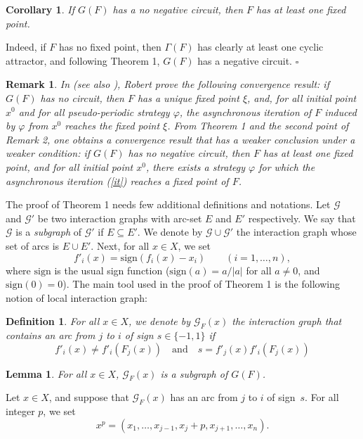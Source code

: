 \documentclass[11pt]{article}
\newtheorem{definition}{Definition}
\newtheorem{lemma}{Lemma}
\newtheorem{remark}{Remark}
\newtheorem{corollary}{Corollary}
\def\proof{\noindent{\bf Proof --~}}
\def\cqfd{\hfill$\square$}
\def\sgn{\mathrm{sign}}
\def\G{\mathscr{G}}
\def\GG{\mathcal{G}}
\def\1n{1,\dots,n}
\def\phi{\varphi}
\begin{document}
\begin{corollary}
If $G(F)$ has a no negative circuit, then $F$ has at least one fixed
point.
\end{corollary}


\proof 
Indeed, if $F$ has no fixed point, then $\Gamma(F)$ has clearly at
least one cyclic attractor, and following Theorem 1, $G(F)$ has a
negative circuit.
\cqfd


\begin{remark}
{\emph{In {\cite[Chapter 13]{R95}} (see also {\cite{BM00}}), Robert
prove the following convergence result: if $G(F)$ has no circuit, then
$F$ has a unique fixed point $\xi$, and, for all initial point $x^0$
and for all pseudo-periodic strategy $\phi$, the asynchronous
iteration of $F$ induced by $\phi$ from $x^0$ reaches the fixed point
$\xi$. From Theorem 1 and the second point of Remark 2, one obtains a
convergence result that has a weaker conclusion under a weaker
condition: if $G(F)$ has no negative circuit, then $F$ has at least
one fixed point, and for all initial point $x^0$, there exists a
strategy $\phi$ for which the asynchronous iteration (\ref{it})
reaches a fixed point of $F$.}}
\end{remark}


The proof of Theorem 1 needs few additional definitions and
notations. Let $\GG$ and $\GG'$ be two interaction graphs with arc-set
$E$ and $E'$ respectively. We say that $\GG$ is a {\emph{subgraph}} of
$\GG'$ if $E\subseteq E'$. We denote by $\GG\cup\GG'$ the interaction
graph whose set of arcs is $E\cup E'$. Next, for all $x\in X$, we set
\[
f'_i(x)=\sgn(f_i(x)-x_i)\qquad (i=\1n),
\]
where $\sgn$ is the usual sign function ($\sgn(a)=a/|a|$ for all
$a\neq 0$, and $\sgn(0)=0$). The main tool used in the proof of
Theorem 1 is the following notion of local interaction graph:

\begin{definition}
For all $x\in X$, we denote by $\G_F(x)$ the interaction graph that
contains an arc from $j$ to $i$ of sign $s\in\{-1,1\}$ if
\[
f'_i(x)\neq f'_i(F_j(x))\quad\textrm{and}\quad s=f'_j(x)f'_i(F_j(x))
\]
\end{definition}


\begin{lemma}{\label{lem:subgraph}}
For all $x\in X$, $\G_F(x)$ is a subgraph of $G(F)$.
\end{lemma}

\proof
Let $x\in X$, and suppose that $\G_F(x)$ has an arc from $j$ to $i$ of
sign~$s$. For all integer $p$, we set
\[
x^p=(x_1,\dots,x_{j-1},x_j+p,x_{j+1},\dots,x_n).
\]
\end{document}
